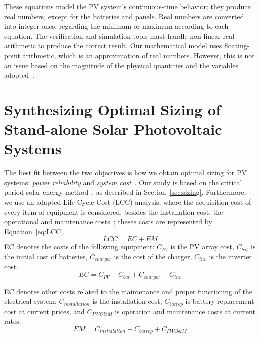 \documentclass[a4paper,donotrepeattitle,fleqn]{cas-dc}
\begin{document}
These equations model the PV system's continuous-time behavior; they produce real numbers, except for the batteries and panels. Real numbers are converted into integer ones, regarding the minimum or maximum according to each equation. The verification and simulation tools must handle non-linear real arithmetic to produce the correct result. Our mathematical model uses floating-point arithmetic, which is an approximation of real numbers. However, this is not an issue based on the magnitude of the physical quantities and the variables adopted~\cite{DBLP:journals/corr/abs-2004-12699}.


\section{Synthesizing Optimal Sizing of Stand-alone Solar Photovoltaic Systems}
\label{sec:SynthesizingOptimalSolarPhotovoltaicSystems}
The best fit between the two objectives is how we obtain optimal sizing for PV systems: \textit{power reliability} and \textit{system cost}~\cite{Alsadi2018}. Our study is based on the critical period solar energy method~\cite{Pinho}, as described in Section~\ref{sec:sizing}. Furthermore, we use an adapted Life Cycle Cost (LCC) analysis, where the acquisition cost of every item of equipment is considered, besides the installation cost, the operational and maintenance costs~\cite{Alsadi2018}; theses costs are represented by Equation~\ref{eq:LCC}.
%
\begin{equation}
\label{eq:LCC}
LCC = EC + EM
\end{equation}
%
\noindent EC denotes the costs of the following equipment: $C_{PV}$ is the PV array cost, $C_{bat}$ is the initial cost of batteries, $C_{charger}$ is the cost of the charger, $C_{inv}$ is the inverter cost.
\begin{equation}
\label{eq:EquipamentCost}
EC = C_{PV} + C_{bat} + C_{charger} + C_{inv}
\end{equation}

EC denotes other costs related to the maintenance and proper functioning of the electrical system: $C_{installation}$ is the installation cost, $C_{batrep}$ is battery replacement cost at current prices, and $C_{PWO\&M}$ is operation and maintenance costs at current rates.
\begin{equation}
\label{eq:EquipamentMaintenence}
EM = C_{installation} + C_{batrep} + C_{PWO\&M}
\end{equation}
\end{document}
